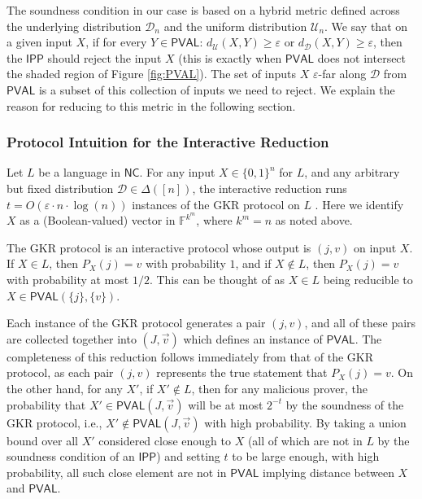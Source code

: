 \documentclass[11pt]{article}
\newcommand{\NC}{\mathsf{NC}}
\newcommand{\PVAL}{\mathsf{PVAL}}
\newcommand{\IPP}{\mathsf{IPP}}
\newcommand{\F}{\mathbb{F}}
\newcommand{\sU}{\mathcal{U}}
\newcommand{\sD}{\mathcal{D}}
\begin{document}
The soundness condition in our case is based on a hybrid metric defined across the underlying distribution $\sD_n$ and the uniform distribution $\sU_n$. We say that on a given input $X$, if for every $Y\in \PVAL$: $d_{\sU}(X,Y)\geq \varepsilon$ or $d_{\sD}(X,Y)\geq \varepsilon$, then the $\IPP$ should reject the input $X$ (this is exactly when $\PVAL$ does not intersect the shaded region of Figure \ref{fig:PVAL}). The set of inputs $X$ $\varepsilon$-far along $\sD$ from $\PVAL$ is a subset of this collection of inputs we need to reject. We explain the reason for reducing to this metric in the following section. 

\subsubsection{Protocol Intuition for the Interactive Reduction}
\label{sec:intuition_reduction_hybrid}

Let $L$ be a language in $\NC$. For any input $X \in \{0,1\}^n$ for $L$, and any arbitrary but fixed distribution $\mathcal{D}\in \Delta([n])$, the interactive reduction runs $t=O(\varepsilon \cdot n \cdot \log (n))$ instances of the GKR protocol on $L$ \cite{GKR15}. Here we identify $X$ as a (Boolean-valued) vector in $\F^{k^{m}}$, where $k^m = n$ as noted above.

The GKR protocol is an interactive protocol whose output is $(j,v)$ on input $X$. If $X\in L$, then $P_X(j)=v$ with probability $1$, and if $X\not\in L$, then $P_X(j) = v$ with probability at most $1/2$. This can be thought of as $X\in L$ being reducible to $X\in \PVAL(\{j\}, \{v\})$.

Each instance of the GKR protocol generates a pair $(j,v)$, and all of these pairs are collected together into $(J,\vec{v})$ which defines an instance of $\PVAL$. The completeness of this reduction follows immediately from that of the GKR protocol, as each pair $(j,v)$ represents the true statement that $P_X(j)=v$. On the other hand, for any $X'$, if $X'\not\in L$, then for any malicious prover, the probability that $X'\in \PVAL(J,\vec{v})$ will be at most $2^{-t}$ by the soundness of the GKR protocol, i.e., $X' \notin \PVAL(J,\vec{v})$ with high probability. By taking a union bound over all $X'$ considered close enough to $X$ (all of which are not in $L$ by the soundness condition of an $\IPP$) and setting $t$ to be large enough, with high probability, all such close element are not in $\PVAL$ implying distance between $X$ and $\PVAL$.
\end{document}
